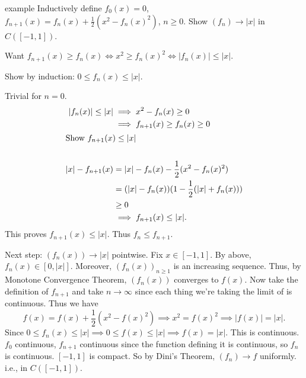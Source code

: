 \documentclass[class=article, crop=false]{standalone}
\begin{document}
\begin{understandingcheck}{example}
  Inductively define $f_0(x) = 0$, $f_{n+1}(x) = f_n(x) + \frac{1}{2}(x^2-f_n(x)^2)$, $n \geq 0$. Show $(f_n) \to |x|$ in $C([-1,1])$.

  \begin{pf}
    Want $f_{n+1}(x) \geq f_n(x) \iff x^2 \geq f_n(x)^2 \iff |f_n(x)| \leq |x|$.

    Show by induction: $0 \leq f_n(x) \leq |x|$.

    Trivial for $n=0$.
      \begin{align*}
        |f_n(x)| \leq |x| &\implies x^2-f_n(x)\geq 0 \\
        &\implies f_{n+1}(x) \geq f_n(x) \geq 0 \\
        \intertext{Show $f_{n+1}(x) \leq |x|$} \\
        |x|-f_{n+1}(x) &= |x| -f_n(x)- \frac{1}{2}(x^2-f_n(x)^2) \\
        &= (|x|-f_n(x))(1-\frac{1}{2}(|x|+f_n(x))) \\
        &\geq 0 \\
        &\implies f_{n+1}(x) \leq |x|.
      \end{align*}
    This proves $f_{n+1}(x) \leq |x|$. Thus $f_n\leq f_{n+1}$.

    Next step: $(f_n(x)) \to |x|$ pointwise. Fix $x \in [-1,1]$. By above, $f_n(x)\in [0,|x|]$. Moreover, $(f_n(x))_{n \geq 1}$ is an increasing sequence. Thus, by Monotone Convergence Theorem, $(f_n(x))$ converges to $f(x)$. Now take the definition of $f_{n+1}$ and take $n \to \infty$ since each thing we're taking the limit of is continuous. Thus we have
      \[
        f(x) = f(x) + \frac{1}{2}(x^2-f(x)^2) \implies x^2=f(x)^2 \implies |f(x)|=|x|.
      \]
    Since $0 \leq f_n(x) \leq |x| \implies 0 \leq f(x) \leq |x| \implies f(x) = |x|$. This is continuous. $f_0$ continuous, $f_{n+1}$ continuous since the function defining it is continuous, so $f_n$ is continuous. $[-1,1]$ is compact. So by Dini's Theorem, $(f_n) \to f$ uniformly. i.e., in $C([-1,1])$.
  \end{pf}
\end{understandingcheck}
\end{document}
